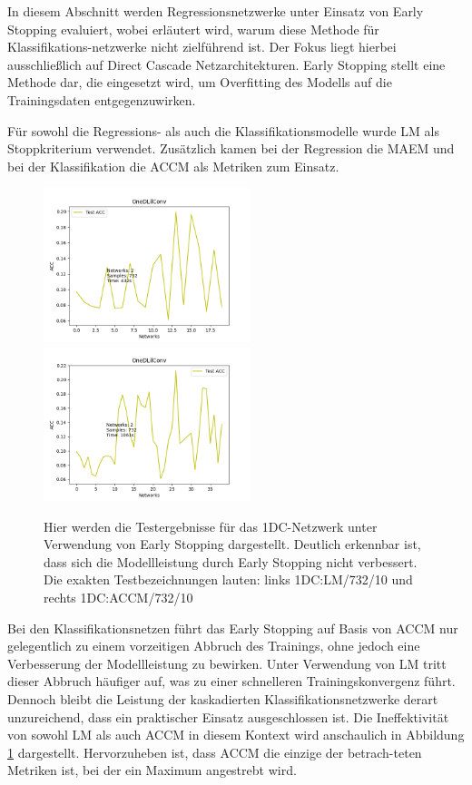 In diesem Abschnitt werden Regressionsnetzwerke unter Einsatz von Early Stopping evaluiert, wobei erläutert wird, warum diese Methode für 
Klassifikations-netzwerke nicht zielführend ist. Der Fokus liegt hierbei ausschließlich auf Direct Cascade Netzarchitekturen. 
Early Stopping stellt eine Methode dar, die eingesetzt wird, um Overfitting des Modells auf die Trainingsdaten entgegenzuwirken.

Für sowohl die Regressions- als auch die Klassifikationsmodelle wurde LM als Stoppkriterium verwendet. Zusätzlich kamen bei der 
Regression die MAEM und bei der Klassifikation die ACCM als Metriken zum Einsatz.

\begin{figure}[htpb]
    \includegraphics[height=4.5cm]{../../Plots/ba_plots/earlystopping/lossmetric/1dconv_ts.png}
    \includegraphics[height=4.5cm]{../../Plots/ba_plots/earlystopping/intermetric/1dconv_ts.png}
    \caption{\label{fig:1dconvmetrics} 
    \small{Hier werden die Testergebnisse für das 1DC-Netzwerk unter Verwendung von Early Stopping dargestellt. Deutlich erkennbar ist, dass sich 
    die Modellleistung durch Early Stopping nicht verbessert. Die exakten Testbezeichnungen lauten: links 1DC:LM/732/10 und rechts 1DC:ACCM/732/10}}
\end{figure}

Bei den Klassifikationsnetzen führt das Early Stopping auf Basis von ACCM nur gelegentlich zu einem vorzeitigen Abbruch des Trainings, ohne 
jedoch eine Verbesserung der Modellleistung zu bewirken. Unter Verwendung von LM tritt dieser Abbruch häufiger auf, was zu einer schnelleren 
Trainingskonvergenz führt. Dennoch bleibt die Leistung der kaskadierten Klassifikationsnetzwerke derart unzureichend, dass ein praktischer 
Einsatz ausgeschlossen ist. Die Ineffektivität von sowohl LM als auch ACCM in diesem Kontext wird anschaulich in 
Abbildung \ref{fig:1dconvmetrics} dargestellt. Hervorzuheben ist, dass ACCM die einzige der betrach-teten Metriken ist, bei der ein Maximum 
angestrebt wird.

